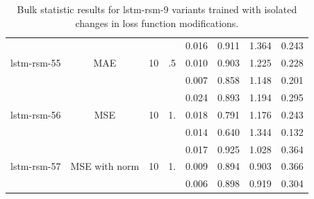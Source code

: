 \begin{table}[H]
\begin{tabular}{c|c|c|c|c|c|c|c }
\hline
\multirow{3}{6em}{lstm-rsm-55} & \multirow{3}{3em}{MAE} & \multirow{3}{3em}{10} &  \multirow{3}{3em}{.5} & 0.016 & 0.911 & 1.364 & 0.243 \\ & & & & 0.010 & 0.903 & 1.225 & 0.228 \\ & & & & 0.007 & 0.858 & 1.148 & 0.201 \\
\hline
\hline
\multirow{3}{6em}{lstm-rsm-56} & \multirow{3}{3em}{MSE} & \multirow{3}{3em}{10} &  \multirow{3}{3em}{1.} & 0.024 & 0.893 & 1.194 & 0.295 \\ & & & & 0.018 & 0.791 & 1.176 & 0.243 \\ & & & & 0.014 & 0.640 & 1.344 & 0.132 \\
\hline
\hline
\multirow{3}{6em}{lstm-rsm-57} & \multirow{3}{3em}{MSE with norm} & \multirow{3}{3em}{10} &  \multirow{3}{3em}{1.} & 0.017 & 0.925 & 1.028 & 0.364 \\ & & & & 0.009 & 0.894 & 0.903 & 0.366 \\ & & & & 0.006 & 0.898 & 0.919 & 0.304 \\
\end{tabular}
    \caption{Bulk statistic results for lstm-rsm-9 variants trained with isolated changes in loss function modifications.}
    \label{loss-variants-table}
\end{table}
